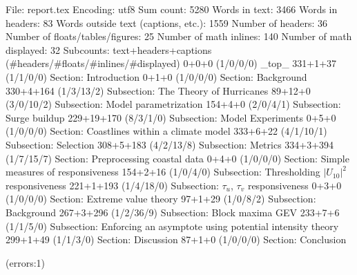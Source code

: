 
File: report.tex
Encoding: utf8
Sum count: 5280
Words in text: 3466
Words in headers: 83
Words outside text (captions, etc.): 1559
Number of headers: 36
Number of floats/tables/figures: 25
Number of math inlines: 140
Number of math displayed: 32
Subcounts:
  text+headers+captions (#headers/#floats/#inlines/#displayed)
  0+0+0 (1/0/0/0) _top_
  331+1+37 (1/1/0/0) Section: Introduction
  0+1+0 (1/0/0/0) Section: Background
  330+4+164 (1/3/13/2) Subsection: The Theory of Hurricanes
  89+12+0 (3/0/10/2) Subsection: Model parametrization
  154+4+0 (2/0/4/1) Subsection: Surge buildup
  229+19+170 (8/3/1/0) Subsection: Model Experiments
  0+5+0 (1/0/0/0) Section: Coastlines within a climate model
  333+6+22 (4/1/10/1) Subsection: Selection
  308+5+183 (4/2/13/8) Subsection: Metrics
  334+3+394 (1/7/15/7) Section: Preprocessing coastal data
  0+4+0 (1/0/0/0) Section: Simple measures of responsiveness
  154+2+16 (1/0/4/0) Subsection: Thresholding $|U_{10}|^2$ responsiveness
  221+1+193 (1/4/18/0) Subsection: $\tau_u$, $\tau_v$ responsiveness
  0+3+0 (1/0/0/0) Section: Extreme value theory
  97+1+29 (1/0/8/2) Subsection: Background
  267+3+296 (1/2/36/9) Subsection: Block maxima GEV
  233+7+6 (1/1/5/0) Subsection: Enforcing an asymptote using potential intensity theory 
  299+1+49 (1/1/3/0) Section: Discussion
  87+1+0 (1/0/0/0) Section: Conclusion

(errors:1)
